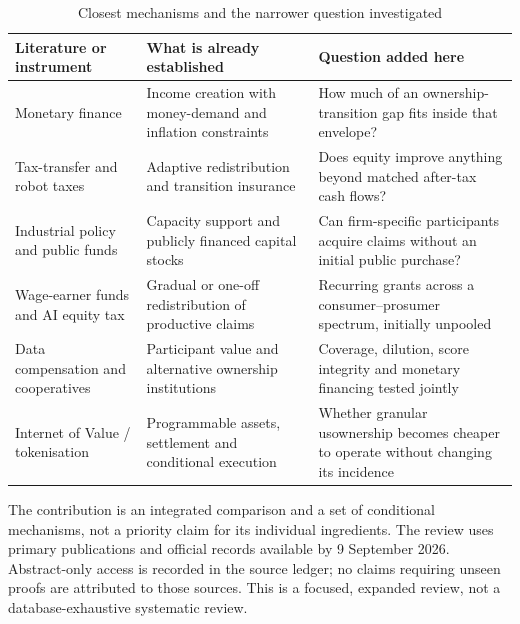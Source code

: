 \begin{table}[htbp]\centering\small
\caption{Closest mechanisms and the narrower question investigated}
\begin{tabularx}{\linewidth}{@{}p{.25\linewidth}p{.31\linewidth}X@{}}
\toprule
Literature or instrument & What is already established & Question added here \\
\midrule
Monetary finance & Income creation with money-demand and inflation constraints & How much of an ownership-transition gap fits inside that envelope?\\
Tax-transfer and robot taxes & Adaptive redistribution and transition insurance & Does equity improve anything beyond matched after-tax cash flows?\\
Industrial policy and public funds & Capacity support and publicly financed capital stocks & Can firm-specific participants acquire claims without an initial public purchase?\\
Wage-earner funds and AI equity tax & Gradual or one-off redistribution of productive claims & Recurring grants across a consumer--prosumer spectrum, initially unpooled\\
Data compensation and cooperatives & Participant value and alternative ownership institutions & Coverage, dilution, score integrity and monetary financing tested jointly\\
Internet of Value / tokenisation & Programmable assets, settlement and conditional execution & Whether granular usownership becomes cheaper to operate without changing its incidence\\
\bottomrule
\end{tabularx}
\end{table}
The contribution is an integrated comparison and a set of conditional mechanisms, not a priority claim for its individual ingredients. The review uses primary publications and official records available by 9 September 2026. Abstract-only access is recorded in the source ledger; no claims requiring unseen proofs are attributed to those sources. This is a focused, expanded review, not a database-exhaustive systematic review.

